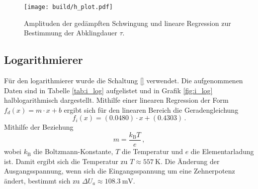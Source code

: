 \begin{figure}[!h]
    \centering
    \texttt{[image: build/h\_plot.pdf]}
    \caption{Amplituden der gedämpften Schwingung und lineare Regression zur Bestimmung der Abklingdauer $\tau$.}
    \label{fig:ged_schwing}
\end{figure}

\begin{table}[!h]
    \centering
    \caption{Gemessene Amplituden einer gedämpften Schwingung.}
    \label{tab:ged_schwing}
    \begin{tabular}
        
    \end{tabular}
\end{table}

\subsection{Logarithmierer} %
\label{sub:logarithmierer}

Für den logarithmierer wurde die Schaltung \ref{} verwendet.
Die aufgenommenen Daten sind in Tabelle \ref{tab:i_log} aufgelistet und in Grafik \ref{fig:i_log} halblogarithmisch dargestellt.
Mithilfe einer linearen Regression der Form $f_{d}(x) = m \cdot x + b$ ergibt sich für den linearen Bereich die Geradengleichung
\begin{equation*}
    f_{i}(x) = (\num{0.0480}) \cdot x + (\num{0.4303})\,.
\end{equation*}
Mithilfe der Beziehung
\begin{equation*}
    m = \frac{k_\mathrm{B} T}{e}\,,
\end{equation*}
wobei $k_\mathrm{B}$ die Boltzmann-Konstante, $T$ die Temperatur und $e$ die Elementarladung ist.
Damit ergibt sich die Temperatur zu $T \approx \SI{557}{\kelvin}$.
Die Änderung der Ausgangsspannung, wenn sich die Eingangsspannung um eine Zehnerpotenz ändert, bestimmt sich zu $\Delta U_a \approx \SI{108.3}{\milli\volt}$.

